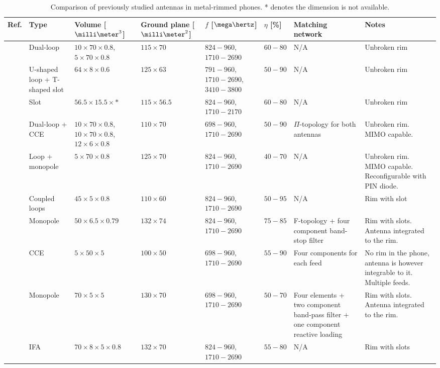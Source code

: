 \begin{table}
\centering
\caption{Comparison of previously studied antennas in metal-rimmed phones. * denotes the dimension is not available.}
\begin{tabular}{|M{0.03\textheight}|M{0.11\textheight}|M{0.1\textheight}|M{0.11\textheight}|M{0.1\textheight}|M{0.06\textheight}|M{0.15\textheight}|>{\Centering\hspace*{0pt}}M{0.18\textheight}|}
    \hline
    \textbf{Ref.} & \textbf{Type} & \textbf{Volume [$\milli\meter^3$]} & \textbf{Ground plane [$\milli\meter^2$]} &\textbf{$f$ [$\mega\hertz$]} & \textbf{$\eta$ [\%]} & \textbf{Matching network} & \textbf{Notes}\\
    \hline
    \cite{ban_dual_loop} & Dual-loop & $10\times70\times0.8$, $5\times70\times0.8$ & $115\times70$ & $824-960$, $1710-2690$ & $60-80$ & N/A & Unbroken rim\\
    \hline
    \cite{hsu_compact} & U-shaped loop + T-shaped slot & $64\times8\times0.6$ & $125\times63$ & $791-960$, $1710-2690$, $3410-3800$ & $50-90$ & N/A & Unbroken rim\\
    \hline
    \cite{yuan_slot} & Slot & $56.5\times15.5\times*$ & $115\times56.5$ & $824-960$, $1710-2170$ & $60-80$ & N/A & Unbroken rim\\
    \hline
    \cite{stanley_lte_mimo} & Dual-loop + CCE & $10\times70\times0.8$, $10\times70\times0.8$, $12\times6\times0.8$ & $110\times70$ & $698-960$, $1710-2690$ & $50-90$ & $\Pi$-topology for both antennas & Unbroken rim. MIMO capable.\\
    \hline
    \cite{reconf_narrow} & Loop + monopole & $5\times70\times0.8$ & $125\times70$ & $824-960$, $1710-2690$ & $40-70$ & N/A & Unbroken rim. MIMO capable. Re\-con\-fi\-gu\-rable with PIN diode.\\
    \hline
    \cite{hybrid} & Coupled loops & $45\times5\times0.8$ & $110\times60$ & $824-960$, $1710-2690$ & $50-95$ & N/A & Rim with slot\\
    \hline
    \cite{lee_monopole} & Monopole & $50\times6.5\times0.79$ & $132\times74$ & $824-960$, $1710-2690$ & $75-85$ & F-topology + four component band-stop filter & Rim with slots. Antenna integrated to the rim.\\
    \hline
    \cite{valkonen_multifeed} & CCE & $5\times50\times5$ & $100\times50$ & $698-960$, $1710-2690$ & $55-90$ & Four components for each feed & No rim in the phone, antenna is however integrable to it. Multiple feeds.\\
    \hline
    \cite{chen_metal_frame} & Monopole & $70\times5\times5$ & $130\times70$ & $698-960$, $1710-2690$ & $50-70$ & Four elements + two component band-pass filter + one component reactive loading & Rim with slots. Antenna integrated to the rim.\\
    \hline
    \cite{hepta_ifa} & IFA & $70\times8\times5\times0.8$ & $132\times70$ & $824-960$, $1710-2690$ & $55-80$ & N/A & Rim with slots\\
    \hline
\end{tabular}
\end{table}

